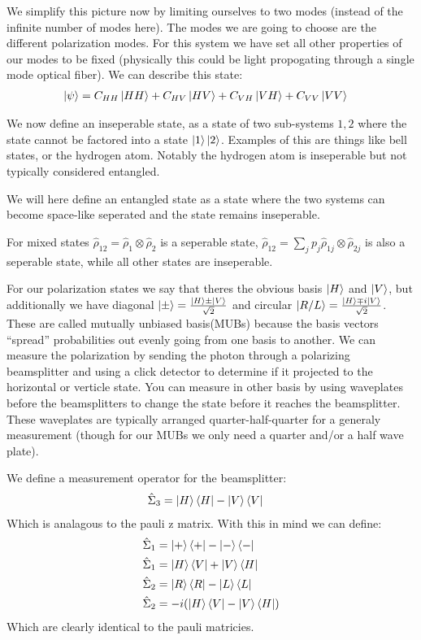 We simplify this picture now by limiting ourselves to two modes (instead of the infinite number of modes here). The modes we are going to choose are the different polarization modes.
For this system we have set all other properties of our modes to be fixed (physically this could be light propogating through a single mode optical fiber). We can describe this state:
\begin{align*}
	\ket{\psi} &= C_{HH} \ket{HH} + C_{HV} \ket{HV} + C_{VH} \ket{VH} + C_{VV}\ket{VV}
\end{align*}

We now define an inseperable state, as a state of two sub-systems $1,2$ where the state cannot be factored into a state $\ket{1}\ket{2}$. Examples of this are things like bell states, or the hydrogen atom.
Notably the hydrogen atom is inseperable but not typically considered entangled.

We will here define an entangled state as a state where the two systems can become space-like seperated and the state remains inseperable.

For mixed states $\hat{\rho}_{12} = \hat{\rho}_1 \otimes \hat{\rho}_2$ is a seperable state, $\hat{\rho}_{12} = \sum_j p_j \hat{\rho}_{1j}\otimes\hat{\rho}_{2j}$ is also a seperable state, while all other states are inseperable.

For our polarization states we say that theres the obvious basis $\ket{H}$ and $\ket{V}$, but additionally we have diagonal $\ket{\pm} = \frac{\ket{H}\pm\ket{V}}{\sqrt{2}}$ and circular $\ket{R/L} = \frac{\ket{H} \mp i\ket{V}}{\sqrt{2}}$.
These are called mutually unbiased basis(MUBs) because the basis vectors ``spread'' probabilities out evenly going from one basis to another.
We can measure the polarization by sending the photon through a polarizing beamsplitter and using a click detector to determine if it projected to the horizontal or verticle state.
You can measure in other basis by using waveplates before the beamsplitters to change the state before it reaches the beamsplitter.
These waveplates are typically arranged quarter-half-quarter for a generaly measurement (though for our MUBs we only need a quarter and/or a half wave plate).

We define a measurement operator for the beamsplitter:
\begin{align*}
	\hat{\Sigma}_3 &= \ket{H}\bra{H} - \ket{V}\bra{V}
\end{align*}
Which is analagous to the pauli z matrix. With this in mind we can define:
\begin{align*}
	\hat{\Sigma}_1 &= \ket{+}\bra{+} - \ket{-}\bra{-} \\
	\hat{\Sigma}_1 &= \ket{H}\bra{V} + \ket{V}\bra{H} \\
	\hat{\Sigma}_2 &= \ket{R}\bra{R} - \ket{L}\bra{L} \\
	\hat{\Sigma}_2 &= -i(\ket{H}\bra{V} - \ket{V}\bra{H})
\end{align*}
Which are clearly identical to the pauli matricies. 

